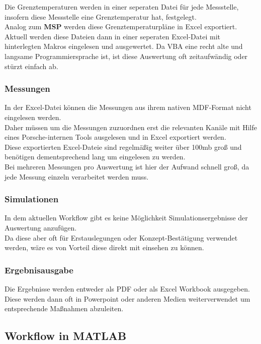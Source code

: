 Die Grenztemperaturen werden in einer seperaten Datei für jede Messstelle, insofern diese Messstelle eine Grenztemperatur hat, festgelegt. \\
Analog zum \textbf{MSP} werden diese Grenztemperaturpläne in Excel exportiert. \\
Aktuell werden diese Dateien dann in einer seperaten Excel-Datei mit hinterlegten Makros eingelesen und ausgewertet. Da VBA eine recht alte und langsame Programmiersprache ist, ist diese Auswertung oft zeitaufwändig oder stürzt einfach ab. \\

\subsubsection{Messungen}

In der Excel-Datei können die Messungen aus ihrem nativen MDF-Format nicht eingelesen werden. \\
Daher müssen um die Messungen zuzuordnen erst die relevanten Kanäle mit Hilfe eines Porsche-internen Tools ausgelesen und in Excel exportiert werden. \\
Diese exportierten Excel-Dateie sind regelmäßig weiter über 100mb groß und benötigen dementsprechend lang um eingelesen zu werden. \\
Bei mehreren Messungen pro Auswertung ist hier der Aufwand schnell groß, da jede Messung einzeln verarbeitet werden muss. 

\subsubsection{Simulationen}

In dem aktuellen Workflow gibt es keine Möglichkeit Simulationsergebnisse der Auswertung anzufügen. \\
Da diese aber oft für Erstauslegungen oder Konzept-Bestätigung verwendet werden, wäre es von Vorteil diese direkt mit einsehen zu können.

\subsubsection{Ergebnisausgabe}

Die Ergebnisse werden entweder als PDF oder als Excel Workbook ausgegeben. \\
Diese werden dann oft in Powerpoint oder anderen Medien weiterverwendet um entsprechende Maßnahmen abzuleiten.

\newpage
\subsection{Workflow in MATLAB}

